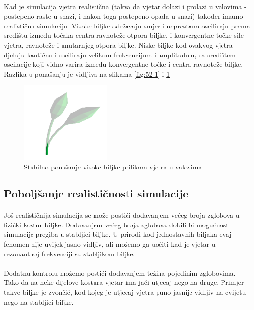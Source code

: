 \documentclass[times, utf8, diplomski]{fer}
\begin{document}
\paragraph{}
Kad je simulacija vjetra realistična (takva da vjetar dolazi i prolazi u 
valovima - postepeno raste u snazi, i nakon toga postepeno opada u snazi) 
također imamo realističnu simulaciju. Visoke biljke održavaju smjer i neprestano 
osciliraju prema središtu između točaka centra ravnoteže otpora biljke, i 
konvergentne točke sile vjetra, ravnoteže i unutarnjeg otpora biljke. Niske 
biljke kod ovakvog vjetra djeluju kaotično i osciliraju velikom frekvencijom i 
amplitudom, sa središtem oscilacije koji vidno varira između konvergentne točke 
i centra ravnoteže biljke. Razlika u ponašanju je vidljiva na slikama \ref{fig:52-1} i \ref{fig:52-2}
\begin{figure}[h]
	\centering
	\includegraphics[width=0.4\textwidth]{img/52-2}
	\caption{Stabilno ponašanje visoke biljke prilikom vjetra u valovima}
	\label{fig:52-2}
\end{figure}

\subsection{Poboljšanje realističnosti simulacije}
\paragraph{}
Još realističnija simulacija se može postići dodavanjem većeg broja zglobova u
fizički kostur biljke. Dodavanjem većeg broja zglobova dobili bi mogućnost 
simulacije pregiba u stabljici biljke. U prirodi kod jednostavnih biljaka ovaj 
fenomen nije uvijek jasno vidljiv, ali možemo ga uočiti kad je vjetar u 
rezonantnoj frekvenciji sa stabljikom biljke.
\paragraph{}
Dodatnu kontrolu možemo postići dodavanjem težina pojedinim zglobovima. Tako da 
na neke dijelove kostura vjetar ima jači utjecaj nego na druge. Primjer takve 
biljke je zvončić, kod kojeg je utjecaj vjetra puno jasnije vidljiv na cvijetu 
nego na stabljici biljke.
\end{document}

